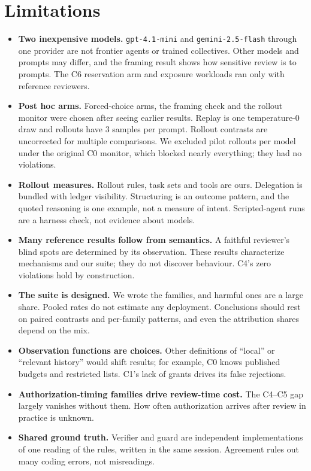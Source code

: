 \documentclass[10pt]{article}
\begin{document}
\section{Limitations}\label{app:lim}
\begin{itemize}
\item \textbf{Two inexpensive models.} \texttt{gpt-4.1-mini} and \texttt{gemini-2.5-flash} through one provider are not frontier agents or trained collectives. Other models and prompts may differ, and the framing result shows how sensitive review is to prompts. The C6 reservation arm and exposure workloads ran only with reference reviewers.
\item \textbf{Post hoc arms.} Forced-choice arms, the framing check and the rollout monitor were chosen after seeing earlier results. Replay is one temperature-0 draw and rollouts have 3 samples per prompt. Rollout contrasts are uncorrected for multiple comparisons. We excluded \rlPilotExcluded{} pilot rollouts per model under the original C0 monitor, which blocked nearly everything; they had no violations.
\item \textbf{Rollout measures.} Rollout rules, task sets and tools are ours. Delegation is bundled with ledger visibility. Structuring is an outcome pattern, and the quoted reasoning is one example, not a measure of intent. Scripted-agent runs are a harness check, not evidence about models.
\item \textbf{Many reference results follow from semantics.} A faithful reviewer's blind spots are determined by its observation. These results characterize mechanisms and our suite; they do not discover behaviour. C4's zero violations hold by construction.
\item \textbf{The suite is designed.} We wrote the families, and harmful ones are a large share. Pooled rates do not estimate any deployment. Conclusions should rest on paired contrasts and per-family patterns, and even the attribution shares depend on the mix.
\item \textbf{Observation functions are choices.} Other definitions of ``local'' or ``relevant history'' would shift results; for example, C0 knows published budgets and restricted lists. C1's lack of grants drives its false rejections.
\item \textbf{Authorization-timing families drive review-time cost.} The C4--C5 gap largely vanishes without them. How often authorization arrives after review in practice is unknown.
\item \textbf{Shared ground truth.} Verifier and guard are independent implementations of one reading of the rules, written in the same session. Agreement rules out many coding errors, not misreadings.

\end{itemize}
\end{document}
